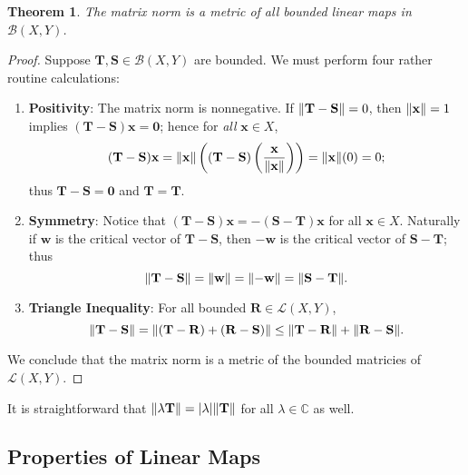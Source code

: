 \documentclass[11pt]{article}
\renewcommand{\vec}[1]{\mathbf{#1}}
\newcommand{\mat}[1]{\mathbf{#1}}
\newtheorem{theorem}{Theorem}
\begin{document}
\begin{theorem}
  The matrix norm is a metric of all bounded linear maps in $\mathcal{B}(X, Y)$.
\end{theorem}
\begin{adjustwidth}{0.5cm}{}
	\begin{proof}
		Suppose $\mat{T}, \mat{S} \in \mathcal{B}(X, Y)$ are bounded. We must perform four rather routine calculations:
		\begin{enumerate}
			\item \textbf{Positivity}: The matrix norm is nonnegative. If $\norm{\mat{T} - \mat{S}} = 0$, then $\norm{\vec{x}} = 1$ implies $(\mat{T} - \mat{S}) \vec{x} = \vec{0}$; hence for \textit{all} $\vec{x} \in X$,
			\[
				(\mat{T} - \mat{S}) \vec{x} = \norm{\vec{x}} \left( (\mat{T} - \mat{S}) \left( \frac{\vec{\vec{x}}}{\norm{\vec{x}}} \right) \right) = \norm{\vec{x}} (0) = 0;
			\]	
			thus $\mat{T} - \mat{S} = \mat{0}$ and $\mat{T} = \mat{T}$.
			\item \textbf{Symmetry}: Notice that $(\mat{T} - \mat{S}) \vec{x} = - (\mat{S} - \mat{T}) \vec{x}$ for all $\vec{x} \in X$. Naturally if $\vec{w}$ is the critical vector of $\mat{T} - \mat{S}$, then $- \vec{w}$ is the critical vector of $\mat{S} - \mat{T}$; thus
			\[
				\norm{\mat{T} - \mat{S}} = \norm{\vec{w}} = \norm{-\vec{w}} = \norm{\mat{S} - \mat{T}}.
			\]	
			\item \textbf{Triangle Inequality}: For all bounded $\mat{R} \in \mathcal{L}(X, Y)$,
			\[
				\norm{\mat{T - S}} = \norm{\mat{(T - R) + (R - S)}} \le \norm{\mat{T - R}} + \norm{\mat{R - S}}.
			\]
		\end{enumerate}
		We conclude that the matrix norm is a metric of the bounded matricies of $\mathcal{L}(X, Y)$.
	\end{proof}
\end{adjustwidth}

It is straightforward that $\norm{\lambda \mat{T}} = \abs{\lambda} \norm{\mat{T}}$ for all $\lambda \in \mathbb{C}$ as well.

\newpage


\subsection{Properties of Linear Maps}
\end{document}
